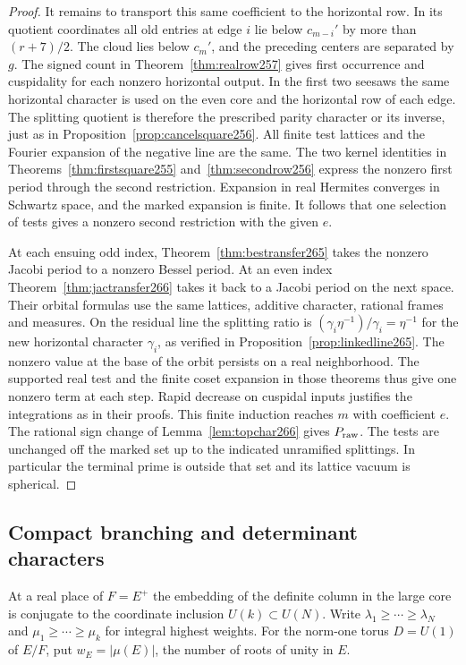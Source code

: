 \documentclass[a4paper,11pt]{article}
\theoremstyle{definition}
\theoremstyle{remark}
\numberwithin{equation}{section}
\begin{document}
\begin{proof}
It remains to transport this same coefficient to the horizontal
row. In its quotient coordinates all old entries at edge \(i\)
lie below \(c_{m-i}'\) by more than \((r+7)/2\). The cloud lies
below \(c_m'\), and the preceding centers are separated by \(g\).
The signed count in Theorem~\ref{thm:realrow257} gives first
occurrence and cuspidality for each nonzero horizontal output.
In the first two seesaws the same horizontal character is
used on the even core and the horizontal row of each edge.
The splitting quotient is therefore the prescribed parity
character or its inverse, just as in
Proposition~\ref{prop:cancelsquare256}. All finite test lattices
and the Fourier expansion of the negative line are the same.
The two kernel identities in Theorems~\ref{thm:firstsquare255}
and~\ref{thm:secondrow256} express the nonzero first period
through the second restriction. Expansion in real Hermites
converges in Schwartz space, and the marked expansion is finite.
It follows that one selection of tests gives a nonzero second
restriction with the given \(e\).

At each ensuing odd index, Theorem~\ref{thm:bestransfer265}
takes the nonzero Jacobi period to a nonzero Bessel period.
At an even index Theorem~\ref{thm:jactransfer266} takes it
back to a Jacobi period on the next space. Their orbital
formulas use the same lattices, additive character, rational
frames and measures. On the residual line the splitting
ratio is \((\gamma_i\eta^{-1})/\gamma_i=\eta^{-1}\)
for the new horizontal character \(\gamma_i\), as verified
in Proposition~\ref{prop:linkedline265}. The nonzero value
at the base of the orbit persists on a real neighborhood.
The supported real test and the finite coset expansion in
those theorems thus give one nonzero term at each step.
Rapid decrease on cuspidal inputs justifies the integrations
as in their proofs. This finite induction reaches \(m\)
with coefficient \(e\). The rational sign change of
Lemma~\ref{lem:topchar266} gives \(P_{\rm raw}\).
The tests are unchanged off the marked set up to the indicated
unramified splittings. In particular the terminal prime is
outside that set and its lattice vacuum is spherical.
\end{proof}

\subsection{Compact branching and determinant characters}\label{nav:V-42}
At a real place of \(F=E^+\) the embedding of the definite
column in the large core is conjugate to the coordinate inclusion
\(U(k)\subset U(N)\). Write \(\lambda_1\ge\cdots\ge\lambda_N\)
and \(\mu_1\ge\cdots\ge\mu_k\) for integral highest weights.
For the norm-one torus \(D=U(1)\) of \(E/F\), put
\(w_E=|\mu(E)|\), the number of roots of unity in \(E\).
\end{document}
